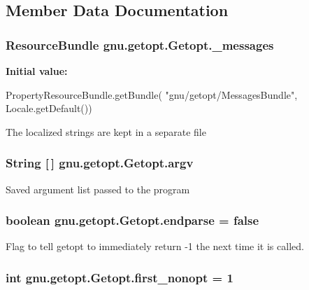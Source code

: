 \subsection{Member Data Documentation}
\hypertarget{classgnu_1_1getopt_1_1_getopt_a3abb4bdca8e36a53d49f71fb1c421512}{
\subsubsection[{\_\-messages}]{\setlength{\rightskip}{0pt plus 5cm}ResourceBundle {\bf gnu.getopt.Getopt.\_\-messages}}}
\label{classgnu_1_1getopt_1_1_getopt_a3abb4bdca8e36a53d49f71fb1c421512}
{\bfseries Initial value:}
\begin{DoxyCode}
 PropertyResourceBundle.getBundle(
                           "gnu/getopt/MessagesBundle", Locale.getDefault())
\end{DoxyCode}
The localized strings are kept in a separate file \hypertarget{classgnu_1_1getopt_1_1_getopt_adde2117f0df42f3254b37b05fd9833cf}{
\subsubsection[{argv}]{\setlength{\rightskip}{0pt plus 5cm}String \mbox{[}$\,$\mbox{]} {\bf gnu.getopt.Getopt.argv}}}
\label{classgnu_1_1getopt_1_1_getopt_adde2117f0df42f3254b37b05fd9833cf}
Saved argument list passed to the program \hypertarget{classgnu_1_1getopt_1_1_getopt_a852cfaf9571de753256f2edd920c6abc}{
\subsubsection[{endparse}]{\setlength{\rightskip}{0pt plus 5cm}boolean {\bf gnu.getopt.Getopt.endparse} = false}}
\label{classgnu_1_1getopt_1_1_getopt_a852cfaf9571de753256f2edd920c6abc}
Flag to tell getopt to immediately return -\/1 the next time it is called. \hypertarget{classgnu_1_1getopt_1_1_getopt_a2af5425ca486d7546c261d5f9f45ed26}{
\subsubsection[{first\_\-nonopt}]{\setlength{\rightskip}{0pt plus 5cm}int {\bf gnu.getopt.Getopt.first\_\-nonopt} = 1}}
